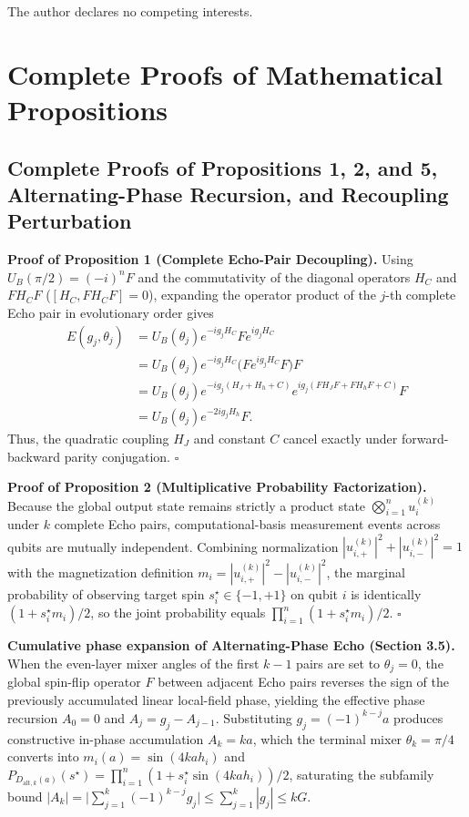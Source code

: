 \documentclass{article}
\theoremstyle{plain}
\theoremstyle{definition}
\begin{document}
The author declares no competing interests.




\newpage
\appendix
\onecolumn
{}
\section{Complete Proofs of Mathematical Propositions}\label{app:A}

\subsection{Complete Proofs of Propositions 1, 2, and 5, Alternating-Phase Recursion, and Recoupling Perturbation}\label{subsec:a_1}

\textbf{Proof of Proposition 1 (Complete Echo-Pair Decoupling).} Using $U_B(\pi/2)=(-i)^nF$ and the commutativity of the diagonal operators $H_C$ and $FH_CF$ ($[H_C, FH_CF]=0$), expanding the operator product of the $j$-th complete Echo pair in evolutionary order gives
\[
\begin{aligned}
E(g_j,\theta_j)
&=U_B(\theta_j)e^{-ig_jH_C}Fe^{ig_jH_C}\\
&=U_B(\theta_j)e^{-ig_jH_C}\big(Fe^{ig_jH_C}F\big)F\\
&=U_B(\theta_j)e^{-ig_j(H_J+H_h+C)}e^{ig_j(FH_JF+FH_hF+C)}F\\
&=U_B(\theta_j)e^{-2ig_jH_h}F.
\end{aligned}
\]
Thus, the quadratic coupling $H_J$ and constant $C$ cancel exactly under forward-backward parity conjugation. \hfill$\square$

\textbf{Proof of Proposition 2 (Multiplicative Probability Factorization).} Because the global output state remains strictly a product state $\bigotimes_{i=1}^n u_i^{(k)}$ under $k$ complete Echo pairs, computational-basis measurement events across qubits are mutually independent. Combining normalization $|u_{i,+}^{(k)}|^2+|u_{i,-}^{(k)}|^2=1$ with the magnetization definition $m_i=|u_{i,+}^{(k)}|^2-|u_{i,-}^{(k)}|^2$, the marginal probability of observing target spin $s_i^\star\in\{-1,+1\}$ on qubit $i$ is identically $(1+s_i^\star m_i)/2$, so the joint probability equals $\prod_{i=1}^n(1+s_i^\star m_i)/2$. \hfill$\square$

\textbf{Cumulative phase expansion of Alternating-Phase Echo (Section 3.5).} When the even-layer mixer angles of the first $k-1$ pairs are set to $\theta_j=0$, the global spin-flip operator $F$ between adjacent Echo pairs reverses the sign of the previously accumulated linear local-field phase, yielding the effective phase recursion $A_0=0$ and $A_j=g_j-A_{j-1}$. Substituting $g_j=(-1)^{k-j}a$ produces constructive in-phase accumulation $A_k=ka$, which the terminal mixer $\theta_k=\pi/4$ converts into $m_i(a)=\sin(4kah_i)$ and $P_{D_{\mathrm{alt},k}(a)}(s^\star)=\prod_{i=1}^n(1+s_i^\star\sin(4kah_i))/2$, saturating the subfamily bound $|A_k|=\big|\sum_{j=1}^k(-1)^{k-j}g_j\big|\le\sum_{j=1}^k|g_j|\le kG$.
\end{document}
